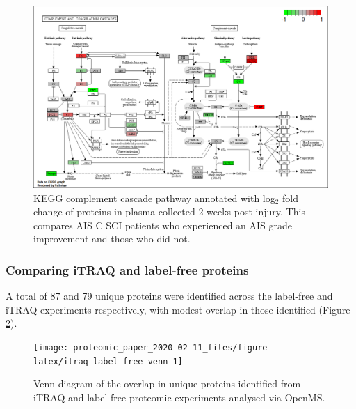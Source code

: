 \documentclass[
]{article}
\begin{document}
\begin{figure}

{\centering \includegraphics[width=18.31in]{figures/kegg_pathways/hsa04610.pathview_label-free} 

}

\caption{KEGG complement cascade pathway annotated with log\(_2\) fold change of proteins in plasma collected 2-weeks post-injury. This compares AIS C SCI patients who experienced an AIS grade improvement and those who did not.}\label{fig:kegg-complement-chap4}
\end{figure}

\hypertarget{comparing-itraq-and-label-free-proteins}{%
\subsubsection{Comparing iTRAQ and label-free proteins}\label{comparing-itraq-and-label-free-proteins}}

A total of 87 and 79 unique proteins were identified across the label-free and iTRAQ experiments respectively, with modest overlap in those identified (Figure \ref{fig:itraq-label-free-venn}).



\begin{figure}

{\centering \texttt{[image: proteomic\_paper\_2020-02-11\_files/figure-latex/itraq-label-free-venn-1]} 

}

\caption{Venn diagram of the overlap in unique proteins identified from iTRAQ and label-free proteomic experiments analysed via OpenMS.}\label{fig:itraq-label-free-venn}
\end{figure}
\end{document}
